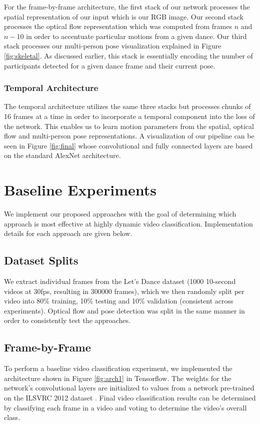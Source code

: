 \documentclass[10pt,twocolumn,letterpaper]{article}
\begin{document}
For the frame-by-frame architecture, the first stack of our network processes the spatial representation of our input which is our RGB image. Our second stack processes the optical flow representation which was computed from frames $n$ and $n-10$ in order to accentuate particular motions from a given dance. Our third stack processes our multi-person pose visualization explained in Figure \ref{fig:skeletal}. As discussed earlier, this stack is essentially encoding the number of participants detected for a given dance frame and their current pose.

\subsubsection{Temporal Architecture}

The temporal architecture utilizes the same three stacks but processes chunks of 16 frames at a time in order to incorporate a temporal component into the loss of the network. This enables us to learn motion parameters from the spatial, optical flow and multi-person pose representations. A visualization of our pipeline can be seen in Figure \ref{fig:final} whose convolutional and fully connected layers are based on the standard AlexNet architecture\cite{NIPS2012_4824}.


\section{Baseline Experiments}
We implement our proposed approaches with the goal of determining which approach is most effective at highly dynamic video classification. Implementation details for each approach are given below.

\subsection{Dataset Splits}
We extract individual frames from the Let's Dance dataset (1000 10-second videos at 30fps, resulting in 300000 frames), which we then randomly split per video into 80\% training, 10\% testing and 10\% validation (consistent across experiments). Optical flow and pose detection was split in the same manner in order to consistently test the approaches.

\subsection{Frame-by-Frame}

To perform a baseline video classification experiment, we implemented the architecture shown in Figure \ref{fig:arch1} in Tensorflow\cite{tensorflow2015-whitepaper}. The weights for the network's convolutional layers are initialized to values from a network pre-trained on the ILSVRC 2012 dataset \cite{ILSVRC15}. Final video classification results can be determined by classifying each frame in a video and voting to determine the video's overall class.
\end{document}
